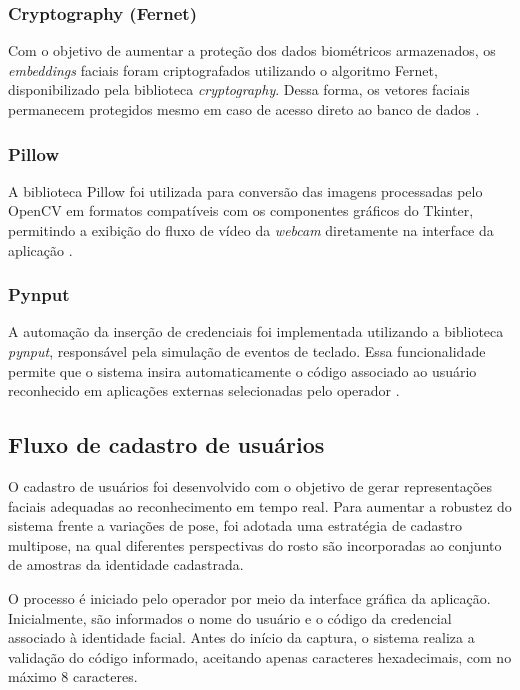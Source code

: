 \subsubsection{Cryptography (Fernet)}

Com o objetivo de aumentar a proteção dos dados biométricos armazenados, os \textit{embeddings} faciais foram criptografados utilizando o algoritmo Fernet, disponibilizado pela biblioteca \textit{cryptography}. Dessa forma, os vetores faciais permanecem protegidos mesmo em caso de acesso direto ao banco de dados \cite{cryptography_fernet_docs}.

\subsubsection{Pillow}

A biblioteca Pillow foi utilizada para conversão das imagens processadas pelo OpenCV em formatos compatíveis com os componentes gráficos do Tkinter, permitindo a exibição do fluxo de vídeo da \textit{webcam} diretamente na interface da aplicação \cite{pillow_docs}.

\subsubsection{Pynput}

A automação da inserção de credenciais foi implementada utilizando a biblioteca \textit{pynput}, responsável pela simulação de eventos de teclado. Essa funcionalidade permite que o sistema insira automaticamente o código associado ao usuário reconhecido em aplicações externas selecionadas pelo operador \cite{pynput_docs}.

\subsection{Fluxo de cadastro de usuários}

O cadastro de usuários foi desenvolvido com o objetivo de gerar representações faciais adequadas ao reconhecimento em tempo real. Para aumentar a robustez do sistema frente a variações de pose, foi adotada uma estratégia de cadastro multipose, na qual diferentes perspectivas do rosto são incorporadas ao conjunto de amostras da identidade cadastrada.

O processo é iniciado pelo operador por meio da interface gráfica da aplicação. Inicialmente, são informados o nome do usuário e o código da credencial associado à identidade facial. Antes do início da captura, o sistema realiza a validação do código informado, aceitando apenas caracteres hexadecimais, com no máximo 8 caracteres.

